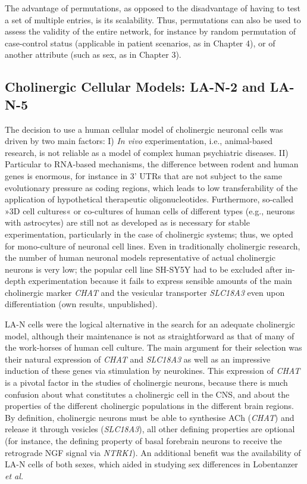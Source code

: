 The advantage of permutations, as opposed to the disadvantage of having to test a set of multiple entries, is its scalability. Thus, permutations can also be used to assess the validity of the entire network, for instance by random permutation of case-control status (applicable in patient scenarios, as in Chapter 4), or of another attribute (such as sex, as in Chapter 3).

\subsection{Cholinergic Cellular Models: LA-N-2 and LA-N-5}
The decision to use a human cellular model of cholinergic neuronal cells was driven by two main factors: I) \emph{In vivo} experimentation, i.e., animal-based research, is not reliable as a model of complex human psychiatric diseases.\cite{} II) Particular to RNA-based mechanisms, the difference between rodent and human genes is enormous, for instance in 3' UTRs that are not subject to the same evolutionary pressure as coding regions, which leads to low transferability of the application of hypothetical therapeutic oligonucleotides.\cite{} Furthermore, so-called »3D cell cultures« or co-cultures of human cells of different types (e.g., neurons with astrocytes) are still not as developed as is necessary for stable experimentation, particularly in the case of cholinergic systems;\cite{} thus, we opted for mono-culture of neuronal cell lines. Even in traditionally cholinergic research, the number of human neuronal models representative of actual cholinergic neurons is very low; the popular cell line SH-SY5Y had to be excluded after in-depth experimentation because it fails to express sensible amounts of the main cholinergic marker \emph{CHAT} and the vesicular transporter \emph{SLC18A3} even upon differentiation (own results, unpublished).

LA-N cells were the logical alternative in the search for an adequate cholinergic model, although their maintenance is not as straightforward as that of many of the work-horses of human cell culture. The main argument for their selection was their natural expression of \emph{CHAT} and \emph{SLC18A3} as well as an impressive induction of these genes via stimulation by neurokines. This expression of \emph{CHAT} is a pivotal factor in the studies of cholinergic neurons, because there is much confusion about what constitutes a cholinergic cell in the CNS, and about the properties of the different cholinergic populations in the different brain regions. By definition, cholinergic neurons must be able to synthesise ACh (\emph{CHAT}) and release it through vesicles (\emph{SLC18A3}), all other defining properties are optional (for instance, the defining property of basal forebrain neurons to receive the retrograde NGF signal via \emph{NTRK1}). An additional benefit was the availability of LA-N cells of both sexes, which aided in studying sex differences in Lobentanzer \emph{et al.}\cite{Lobentanzer2019a}

